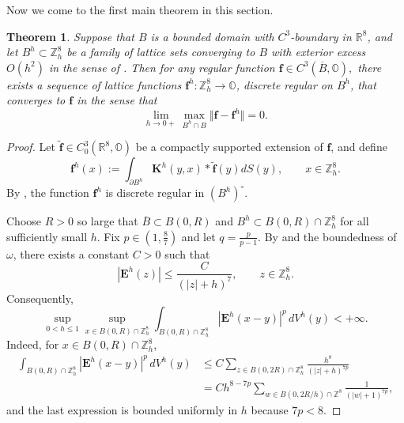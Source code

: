 \documentclass{amsart}
\newtheorem{theorem}{Theorem}[section]
\theoremstyle{definition}
\theoremstyle{remark}
\numberwithin{equation}{section}
\newcommand{\R}{\mathbb{R}}
\newcommand{\p}{\partial}
\newcommand{\OO}{\mathbb O}
\newcommand{\Z}{\mathbb Z}
\newcommand{\f}{\bm{f}}
\newcommand{\E}{\bm{E}}
\begin{document}
Now we come to the first main theorem in this section.


\begin{theorem}\label{thm:scaling-limit-approximation}\label{2023-09-11 20:34:07}
    Suppose that $B$ is a bounded domain with $C^3$-boundary in $\R^8$, and let $B^h\subset \Z_h^8$ be a family of lattice sets converging to $B$ with exterior excess $O(h^2)$ in the sense of . Then for any regular function $\f \in C^3(\overline B,\OO),$ there exists a sequence of lattice functions $\f^h : \Z_h^8 \longrightarrow \OO$, discrete regular on \(B^h\), that converges to $\f$ in the sense that \[
\lim_{h\to 0+} \max_{ B^h \cap B} \Vert \f-\f^h\Vert =0.
\]
\end{theorem}
\begin{proof}
    Let $\bm {\tilde f}\in C^3_0(\R^8,\OO)$ be a compactly supported extension of $\f$, and define
    \begin{equation}
        \label{2023-09-11 17:33:45}
        \f^h(x):=\int_{\p B^h} \bm K^h(y,x)* \bm {\tilde f} (y)dS(y),
        \qquad x\in \Z_h^8.
    \end{equation}
    By , the function $\f^h$ is discrete regular in $(B^h)^\circ$.

    Choose $R>0$ so large that $\overline B\subset B(0,R)$ and $B^h\subset B(0,R)\cap \Z_h^8$ for all sufficiently small $h$.
    Fix $p\in (1,\frac{8}{7})$ and let $q=\frac{p}{p-1}$.
    By  and the boundedness of $\omega$, there exists a constant $C>0$ such that
    \begin{equation}
        \label{2026-04-01 00:00:01}
        |\E^h(z)|\le \frac{C}{(|z|+h)^7}, \qquad z\in \Z_h^8.
    \end{equation}
    Consequently,
    \begin{equation}
        \label{2026-04-01 00:00:02}
        \sup_{0<h\le 1}\sup_{x\in B(0,R)\cap \Z_h^8}
        \int_{B(0,R)\cap \Z_h^8} |\E^h(x-y)|^p\,dV^h(y)<+\infty.
    \end{equation}
    Indeed, for $x\in B(0,R)\cap \Z_h^8$,
    \begin{equation*}
        \begin{aligned}
            \int_{B(0,R)\cap \Z_h^8} |\E^h(x-y)|^p\,dV^h(y)
            &\le C\sum_{z\in B(0,2R)\cap \Z_h^8}\frac{h^8}{(|z|+h)^{7p}}\\
            &=Ch^{8-7p}\sum_{w\in B(0,2R/h)\cap \Z^8}\frac{1}{(|w|+1)^{7p}},
        \end{aligned}
    \end{equation*}
    and the last expression is bounded uniformly in $h$ because $7p<8$.


\end{proof}
\end{document}
